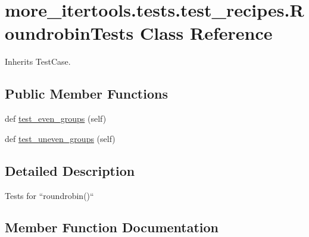 \hypertarget{classmore__itertools_1_1tests_1_1test__recipes_1_1_roundrobin_tests}{}\section{more\+\_\+itertools.\+tests.\+test\+\_\+recipes.\+Roundrobin\+Tests Class Reference}
\label{classmore__itertools_1_1tests_1_1test__recipes_1_1_roundrobin_tests}


Inherits Test\+Case.

\subsection*{Public Member Functions}
\begin{DoxyCompactItemize}
\item 
def \hyperlink{classmore__itertools_1_1tests_1_1test__recipes_1_1_roundrobin_tests_adae1de02cee77a0ecfe6a36eb254a9c2}{test\+\_\+even\+\_\+groups} (self)
\item 
def \hyperlink{classmore__itertools_1_1tests_1_1test__recipes_1_1_roundrobin_tests_a3191268c39a2e798fe9c672538e45c0f}{test\+\_\+uneven\+\_\+groups} (self)
\end{DoxyCompactItemize}


\subsection{Detailed Description}
\begin{DoxyVerb}Tests for ``roundrobin()``\end{DoxyVerb}
 

\subsection{Member Function Documentation}
\mbox{\label{classmore__itertools_1_1tests_1_1test__recipes_1_1_roundrobin_tests_adae1de02cee77a0ecfe6a36eb254a9c2}} 
